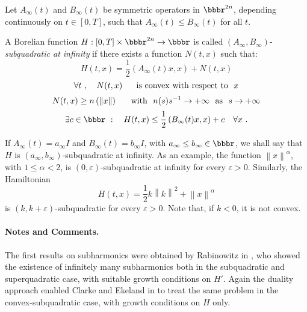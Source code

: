 \documentclass{llncs}
\begin{document}
    \begin{definition}
    Let $A_{\infty} (t)$ and $B_{\infty} (t)$ be symmetric
    operators in $\bbbr^{2n}$, depending continuously on
    $t\in [0,T]$, such that
    $A_{\infty} (t) \le B_{\infty} (t)$ for all $t$.
    
    A Borelian function
    $H: [0,T]\times \bbbr^{2n} \to \bbbr$
    is called
    $\left(A_{\infty} ,B_{\infty}\right)$-{\it subquadratic at infinity}
    if there exists a function $N(t,x)$ such that:
    \begin{equation}
      H (t,x) = \frac{1}{2} \left(A_{\infty} (t) x,x\right) + N(t,x)
    \end{equation}
    \begin{equation}
      \forall t\ ,\ \ \ N(t,x)\ \ \ \ \
      {\rm is\ convex\ with\  respect\  to}\ \ x
    \end{equation}
    \begin{equation}
      N(t,x) \ge n\left(\left\|x\right\|\right)\ \ \ \ \
      {\rm with}\ \ n(s)s^{-1}\to +\infty\ \ {\rm as}\ \ s\to +\infty
    \end{equation}
    \begin{equation}
      \exists c\in \bbbr\ :\ \ \ H (t,x) \le
      \frac{1}{2} \left(B_{\infty} (t) x,x\right) + c\ \ \ \forall x\ .
    \end{equation}
    
    If $A_{\infty} (t) = a_{\infty} I$ and
    $B_{\infty} (t) = b_{\infty} I$, with
    $a_{\infty} \le b_{\infty} \in \bbbr$,
    we shall say that $H$ is
    $\left(a_{\infty},b_{\infty}\right)$-subquadratic
    at infinity. As an example, the function
    $\left\|x\right\|^{\alpha}$, with
    $1\le \alpha < 2$, is $(0,\varepsilon )$-subquadratic at infinity
    for every $\varepsilon > 0$. Similarly, the Hamiltonian
    \begin{equation}
    H (t,x) = \frac{1}{2} k \left\|k\right\|^{2} +\left\|x\right\|^{\alpha}
    \end{equation}
    is $(k,k+\varepsilon )$-subquadratic for every $\varepsilon > 0$.
    Note that, if $k<0$, it is not convex.
    \end{definition}
    
    \paragraph{Notes and Comments.}
    The first results on subharmonics were
    obtained by Rabinowitz in \cite{rab}, who showed the existence of
    infinitely many subharmonics both in the subquadratic and superquadratic
    case, with suitable growth conditions on $H'$. Again the duality
    approach enabled Clarke and Ekeland in \cite{clar:eke:2} to treat the
    same problem in the convex-subquadratic case, with growth conditions on
    $H$ only.
    
\end{document}
